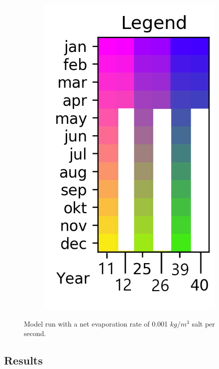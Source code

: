 \documentclass[twocolumn]{article}
\begin{document}
\begin{figure}
\begin{subfigure}[h]{0.20\textwidth}
\includegraphics[width=\linewidth,keepaspectratio]{40yr_reduced_Legend.png}
\end{subfigure}\hfill
\caption{Model run with a net evaporation rate of 0.001 $kg/m^3$ salt per second.}
\label{fig:net_evap}
\end{figure}



\subsection{Results}
\end{document}
